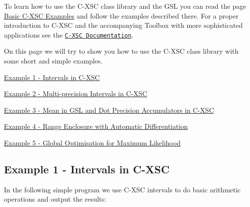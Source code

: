 \-To learn how to use the \-C-\/\-X\-S\-C class library and the \-G\-S\-L you can read the page \hyperlink{cxscexamples}{\-Basic \-C-\/\-X\-S\-C \-Examples} and follow the examples described there. \-For a proper introduction to \-C-\/\-X\-S\-C and the accompanying \-Toolbox with more sophisticated applications see the \href{http://www.math.uni-wuppertal.de/wrswt/xsc/cxsc/apidoc/html/index.html}{\tt \-C-\/\-X\-S\-C \-Documentation}.

\-On this page we will try to show you how to use the \-C-\/\-X\-S\-C class library with some short and simple examples.


\begin{DoxyItemize}
\item \hyperlink{cxscexamples_cxscexamples_sec_ex1}{\-Example 1 -\/ \-Intervals in \-C-\/\-X\-S\-C}
\item \hyperlink{cxscexamples_cxscexamples_sec_ex2}{\-Example 2 -\/ \-Multi-\/precision \-Intervals in \-C-\/\-X\-S\-C}
\item \hyperlink{cxscexamples_cxscexamples_sec_ex3}{\-Example 3 -\/ \-Mean in \-G\-S\-L and \-Dot \-Precision \-Accumulators in \-C-\/\-X\-S\-C}
\item \hyperlink{cxscexamples_cxscexamples_sec_ex4}{\-Example 4 -\/ \-Range \-Enclosure with \-Automatic \-Differentiation}
\item \hyperlink{cxscexamples_cxscexamples_sec_ex5}{\-Example 5 -\/ \-Global \-Optimisation for \-Maximum \-Likelihood}
\end{DoxyItemize}\hypertarget{cxscexamples_cxscexamples_sec_ex1}{}\subsection{\-Example 1 -\/ Intervals in C-\/\-X\-S\-C}\label{cxscexamples_cxscexamples_sec_ex1}
\-In the following simple program we use \-C-\/\-X\-S\-C intervals to do basic arithmetic operations and output the results\-:









